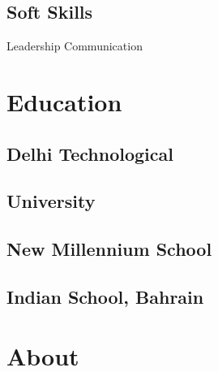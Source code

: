 \documentclass[letterpaper]{deedy-resume} %
\begin{document}
\begin{minipage}[t]{0.33\textwidth}
\subsection{Soft Skills}
Leadership \hspace{0.1cm} \textbullet \hspace{0.1cm}
Communication
\sectionspace

\section{Education} 

\subsection{Delhi Technological}
\subsection{University}


\sectionspace

\subsection{New Millennium School}


\sectionspace %

\subsection{Indian School, Bahrain}


\sectionspace %

\section{About} 


\end{minipage}
\end{document}
